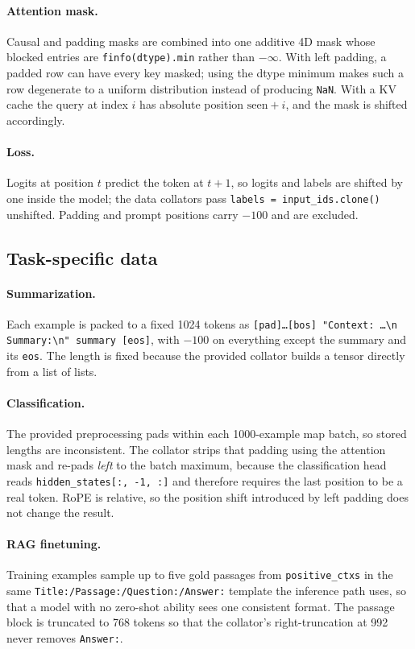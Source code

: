 \documentclass[11pt]{article}
\begin{document}
\paragraph{Attention mask.} Causal and padding masks are combined into one additive 4D mask
whose blocked entries are \texttt{finfo(dtype).min} rather than $-\infty$. With left padding,
a padded row can have every key masked; using the dtype minimum makes such a row degenerate to
a uniform distribution instead of producing \texttt{NaN}. With a KV cache the query at index
$i$ has absolute position $\text{seen}+i$, and the mask is shifted accordingly.

\paragraph{Loss.} Logits at position $t$ predict the token at $t+1$, so logits and labels are
shifted by one inside the model; the data collators pass \texttt{labels = input\_ids.clone()}
unshifted. Padding and prompt positions carry $-100$ and are excluded.

\subsection{Task-specific data}

\paragraph{Summarization.} Each example is packed to a fixed 1024 tokens as
\texttt{[pad]\dots[bos] "Context: \dots\textbackslash n Summary:\textbackslash n" summary [eos]},
with $-100$ on everything except the summary and its \texttt{eos}. The length is fixed because
the provided collator builds a tensor directly from a list of lists.

\paragraph{Classification.} The provided preprocessing pads within each 1000-example map
batch, so stored lengths are inconsistent. The collator strips that padding using the
attention mask and re-pads \emph{left} to the batch maximum, because the classification head
reads \texttt{hidden\_states[:, -1, :]} and therefore requires the last position to be a real
token. RoPE is relative, so the position shift introduced by left padding does not change the
result.

\paragraph{RAG finetuning.} Training examples sample up to five gold passages from
\texttt{positive\_ctxs} in the same
\texttt{Title:/Passage:/Question:/Answer:} template the inference path uses, so that a model
with no zero-shot ability sees one consistent format. The passage block is truncated to 768
tokens so that the collator's right-truncation at 992 never removes \texttt{Answer:}.
\end{document}

